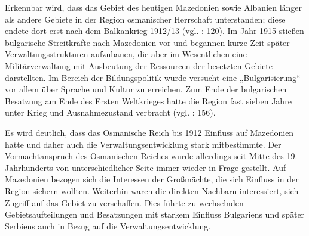  Erkennbar wird, dass das Gebiet des heutigen Mazedonien sowie Albanien länger als andere Gebiete in der Region osmanischer Herrschaft unterstanden; diese endete dort erst nach dem Balkankrieg 1912/13 (vgl. \cite{batal98} : 120). Im Jahr 1915 stießen bulgarische Streitkräfte nach Mazedonien vor und begannen kurze Zeit später Verwaltungsstrukturen aufzubauen, die aber im Wesentlichen eine Militärverwaltung mit Ausbeutung der Ressourcen der besetzten Gebiete darstellten. Im Bereich der Bildungspolitik wurde versucht eine „Bulgarisierung“ vor allem über Sprache und Kultur zu erreichen. Zum Ende der bulgarischen Besatzung am Ende des Ersten Weltkrieges hatte die Region fast sieben Jahre unter Krieg und Ausnahmezustand verbracht (vgl. \cite{opfer} : 156).\par
Es wird deutlich, dass das Osmanische Reich bis 1912 Einfluss auf Mazedonien hatte und daher auch die Verwaltungsentwicklung stark mitbestimmte. Der Vormachtanspruch des Osmanischen Reiches wurde allerdings seit Mitte des 19. Jahrhunderts von unterschiedlicher Seite immer wieder in Frage gestellt. Auf Mazedonien bezogen sich die Interessen der Großmächte, die sich Einfluss in der Region sichern wollten. Weiterhin waren die direkten Nachbarn interessiert, sich Zugriff auf das Gebiet zu verschaffen. Dies führte zu wechselnden Gebietsaufteilungen und Besatzungen mit starkem Einfluss Bulgariens und später Serbiens auch in Bezug auf die Verwaltungsentwicklung. 





